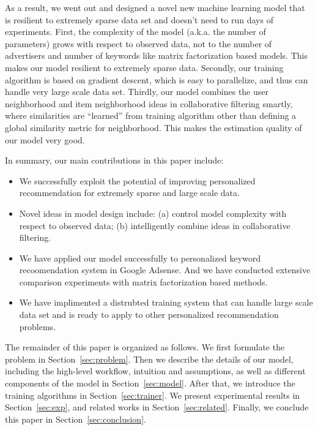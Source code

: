 As a result, we went out and designed a novel new machine learning
model that is resilient to extremely sparse data set and doesn't need
to run days of experiments. First, the complexity of the model
(a.k.a. the number of parameters) grows with respect to observed data,
not to the number of advertisers and number of keywords like matrix
factorization based models. This makes our model resilient to
extremely sparse data. Secondly, our training algorithm is based on
gradient descent, which is easy to parallelize, and thus can handle
very large scale data set. Thirdly, our model combines the user
neighborhood and item neighborhood ideas in collaborative filtering
smartly, where similarities are ``learned'' from training algorithm
other than defining a global similarity metric for neighborhood. This
makes the estimation quality of our model very good.

In summary, our main contributions in this paper include:
\begin{itemize} \itemsep -1pt
\item We successfully exploit the potential of improving personalized
  recommendation for extremely sparse and large scale data.
\item Novel ideas in model design include: (a) control model
  complexity with respect to observed data; (b) intelligently combine
  ideas in collaborative filtering.
\item We have applied our model successfully to personalized keyword
  recoomendation system in Google Adsense. And we have conducted
  extensive comparison experiments with matrix factorization based
  methods.
\item We have implimented a distrubted training system that can handle
  large scale data set and is ready to apply to other personalized
  recommendation problems.
\end{itemize}

The remainder of this paper is organized as follows. We first
formulate the problem in Section~\ref{sec:problem}. Then we describe
the details of our model, including the high-level workflow, intuition
and assumptions, as well as different components of the model in
Section~\ref{sec:model}. After that, we introduce the training
algorithms in Section~\ref{sec:trainer}. We present experimental
results in Section~\ref{sec:exp}, and related works in
Section~\ref{sec:related}. Finally, we conclude this paper in
Section~\ref{sec:conclusion}.
